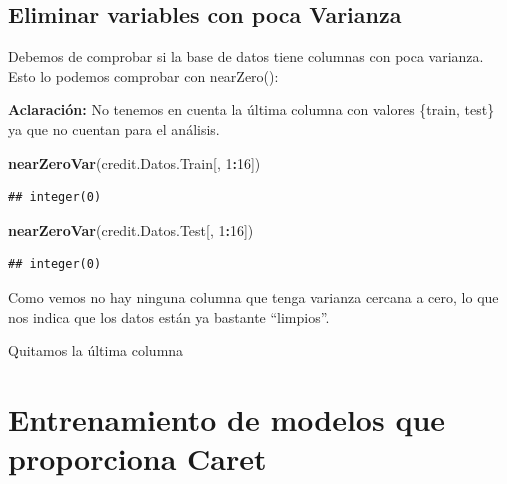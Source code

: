 \documentclass[
]{article}
\newenvironment{Shaded}{\begin{snugshade}}{\end{snugshade}}
\newcommand{\ConstantTok}[1]{\textcolor[rgb]{0.56,0.35,0.01}{#1}}
\newcommand{\DecValTok}[1]{\textcolor[rgb]{0.00,0.00,0.81}{#1}}
\newcommand{\FunctionTok}[1]{\textcolor[rgb]{0.13,0.29,0.53}{\textbf{#1}}}
\newcommand{\NormalTok}[1]{#1}
\newcommand{\OtherTok}[1]{\textcolor[rgb]{0.56,0.35,0.01}{#1}}
\newcommand{\SpecialCharTok}[1]{\textcolor[rgb]{0.81,0.36,0.00}{\textbf{#1}}}
\begin{document}
\hypertarget{eliminar-variables-con-poca-varianza}{%
\subsection{Eliminar variables con poca
Varianza}\label{eliminar-variables-con-poca-varianza}}

Debemos de comprobar si la base de datos tiene columnas con poca
varianza. Esto lo podemos comprobar con nearZero():

\textbf{Aclaración:} No tenemos en cuenta la última columna con valores
\{train, test\} ya que no cuentan para el análisis.

\begin{Shaded}
\begin{Highlighting}[]
\FunctionTok{nearZeroVar}\NormalTok{(credit.Datos.Train[, }\DecValTok{1}\SpecialCharTok{:}\DecValTok{16}\NormalTok{])}
\end{Highlighting}
\end{Shaded}

\begin{verbatim}
## integer(0)
\end{verbatim}

\begin{Shaded}
\begin{Highlighting}[]
\FunctionTok{nearZeroVar}\NormalTok{(credit.Datos.Test[, }\DecValTok{1}\SpecialCharTok{:}\DecValTok{16}\NormalTok{])}
\end{Highlighting}
\end{Shaded}

\begin{verbatim}
## integer(0)
\end{verbatim}

Como vemos no hay ninguna columna que tenga varianza cercana a cero, lo
que nos indica que los datos están ya bastante ``limpios''.

Quitamos la última columna

\begin{Shaded}
\end{Shaded}

\hypertarget{entrenamiento-de-modelos-que-proporciona-caret}{%
\section{Entrenamiento de modelos que proporciona
Caret}\label{entrenamiento-de-modelos-que-proporciona-caret}}
\end{document}
